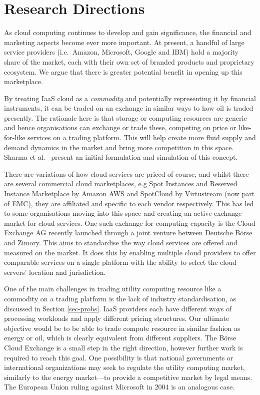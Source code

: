 \documentclass[conference,10pt]{IEEEtran}
\begin{document}

\section{Research Directions}
\label{sec-directions}

As cloud computing continues to develop and gain significance, the financial and marketing aspects become ever more important.
At present, a handful of large service providers (i.e.\ Amazon, Microsoft, Google and IBM) hold a majority share of the market, each with their own set of branded products and proprietary ecosystem. We argue that there is greater potential benefit in opening up this marketplace.

By treating IaaS cloud as a \emph{commodity} and potentially representing it by financial instruments, it can be traded on an exchange in similar ways to how oil is traded presently. The rationale here is that storage or computing resources are generic and hence organisations can exchange or trade these, competing on price or like-for-like services on a trading platform. This will help create more fluid supply and demand dynamics in the market and bring more competition in this space. Sharma et al.\ \cite{sharma12pricing} present an initial formulation and simulation of this concept.

There are variations of how cloud services are priced of course, and whilst there are several commercial cloud marketplaces, e.g Spot Instances and Reserved Instance Marketplace by Amazon AWS and SpotCloud by Virtustream (now part of EMC), they are affiliated and specific to each vendor respectively. 
This has led to some organisations moving into this space and creating an active exchange market for cloud services. One such exchange for computing capacity is the Cloud Exchange AG \cite{url7} recently launched through a joint venture between Deutsche B\"{o}rse and Zimory.  This aims to standardise the way cloud services are offered and measured on the market. It does this by enabling multiple cloud providers to offer comparable services on a single platform with the ability to select the cloud servers' location and jurisdiction.

One of the main challenges in trading utility computing resource like a commodity on a trading platform is the lack of industry standardisation, as discussed in Section \ref{sec-probs}.
IaaS providers each have different ways of processing workloads and apply different pricing structures. Our ultimate objective would be to be able to trade compute resource in similar fashion as energy or oil, which is clearly equivalent from different suppliers.
The B\"{o}rse Cloud Exchange is a small step in the right direction, however further work is required to reach this goal. One possibility is that national governments or international organizations may seek to regulate the utility computing market, similarly to the energy market---to provide a competitive market by legal means. The European Union ruling against Microsoft in 2004 is an analogous case.
\end{document}

